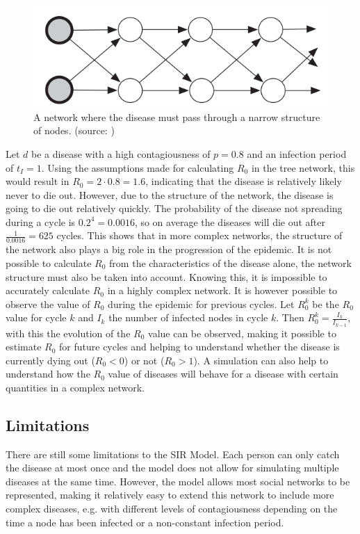 \begin{figure}
    \centering
    \includegraphics[width=0.5\linewidth]{images/narrow_network.png}
    \caption{A network where the disease must pass through a narrow structure of nodes. (source: \cite{networks})}
    \label{fig:narrow_network}
\end{figure}

Let $d$ be a disease with a high contagiousness of $p=0.8$ and an infection period of $t_I=1$. 
Using the assumptions made for calculating $R_0$ in the tree network, this would result 
in $R_0 = 2 \cdot 0.8 = 1.6$, indicating that the disease is relatively likely 
never to die out. However, due to the structure of the network, the disease is going to 
die out relatively quickly. The probability of the disease not spreading during a cycle is
$0.2^4=0.0016$, so on average the diseases will die out after $\frac{1}{0.0016}=625$ cycles.
This shows that in more complex networks, the structure of the network also plays a big role
in the progression of the epidemic. It is not possible to calculate $R_0$ from the
characteristics of the disease alone, the network structure must also be taken into account.
Knowing this, it is impossible to accurately calculate $R_0$ in a highly complex network.
It is however possible to observe the value of $R_0$ during the epidemic for previous cycles.
Let $R_0^k$ be the $R_0$ value for cycle $k$ and $I_k$ the number of infected nodes in cycle $k$.
Then $R_0^k = \frac{I_k}{I_{k-1}}$, with this the evolution of the $R_0$ value can be 
observed, making it possible to estimate $R_0$ for future cycles and helping to understand
whether the disease is currently dying out ($R_0<0$) or not ($R_0>1$). A simulation can also
help to understand how the $R_0$ value of diseases will behave for a disease with certain 
quantities in a complex network.

\subsection{Limitations}
There are still some limitations to the SIR Model. Each person can only catch the disease at
most once and the model does not allow for simulating multiple diseases at the same time.
However, the model allows most social networks to be represented, making it relatively easy
to extend this network to include more complex diseases, e.g. with different levels of contagiousness
depending on the time a node has been infected or a non-constant infection period.

